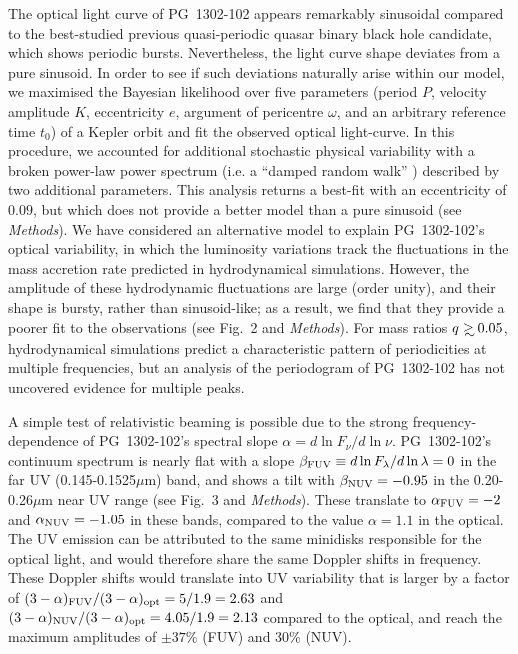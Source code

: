 The optical light curve of PG~1302-102 appears remarkably sinusoidal
compared to the best-studied previous quasi-periodic quasar binary
black hole candidate, which shows periodic bursts\cite{Valtonen+2008}.
Nevertheless, the light curve shape deviates from a pure sinusoid. In
order to see if such deviations naturally arise within our model, we
maximised the Bayesian likelihood over five parameters (period $P$,
velocity amplitude $K$, eccentricity $e$, argument of pericentre
$\omega$, and an arbitrary reference time $t_0$) of a Kepler
orbit\cite{WrightGaudi2012} and fit the observed optical light-curve.
In this procedure, we accounted for additional stochastic physical
variability with a broken power-law power spectrum (i.e. a ``damped
random walk'' \cite{Kelly:2009:DRW}) described by two additional
parameters.  This analysis returns a best-fit 
%
with an eccentricity of $0.09$, but which does not provide a better model than a pure sinusoid (see {\it Methods}).
%
We have considered an alternative model to explain PG~1302-102's
optical variability, in which the luminosity variations track the
fluctuations in the mass accretion rate predicted in hydrodynamical
simulations\cite{MacFadyen:2008,ShiKrolik:2012,Roedig:2012:Trqs,DHM:2013:MNRAS,Farris:2014}.
However, the amplitude of these hydrodynamic fluctuations are large
(order unity), and their shape is bursty, rather than
sinusoid-like\cite{DHM:2013:MNRAS,Farris:2014,ShiKrolik:2015}; as a
result, we find that they provide a poorer fit to the observations
(see Fig.~2 and {\it Methods}).  For mass ratios $q\gsim 0.05$,
hydrodynamical simulations predict a characteristic pattern of
periodicities at multiple frequencies, but an analysis of the
periodogram of PG~1302-102 has not uncovered evidence for multiple
peaks\cite{PG1302-Maria}.

A simple test of relativistic beaming is possible due to the strong
frequency-dependence of PG~1302-102's spectral slope $\alpha=d\ln
F_\nu /d\ln\nu$.  PG~1302-102's continuum spectrum is nearly flat with
a slope $\beta_{\rm FUV}\equiv d\ln F_\lambda /d\ln\lambda=0$ in the
far UV (0.145-0.1525$\mu$m) band, and shows a tilt with $\beta_{\rm
  NUV}=-0.95$ in the 0.20-0.26$\mu$m near UV range (see Fig.~3 and
{\it Methods}).  These translate to $\alpha_{\rm FUV}=-2$ and
$\alpha_{\rm NUV}=-1.05$ in these bands, compared to the value
$\alpha=1.1$ in the optical.  The UV emission can be attributed to the
same minidisks responsible for the optical light, and would therefore
share the same Doppler shifts in frequency. These Doppler shifts would
translate into UV variability that is larger by a factor of
$(3-\alpha)_{\rm FUV}/(3-\alpha)_{\rm opt}=5/1.9 = 2.63$ and
$(3-\alpha)_{\rm NUV}/(3-\alpha)_{\rm opt}=4.05/1.9 = 2.13$ compared
to the optical, and reach the maximum amplitudes of $\pm 37\%$ (FUV)
and 30\% (NUV).

